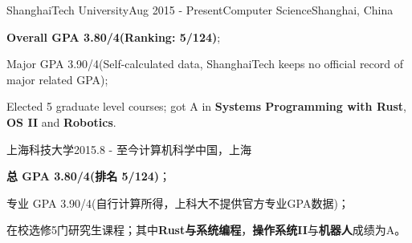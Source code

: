 \ifx\lang\eng
	\begin{rSubsection}{ShanghaiTech University}{Aug 2015 - Present}{Computer Science}{Shanghai, China}
		\item \textbf{Overall GPA 3.80/4(Ranking: 5/124)};
		\item Major GPA 3.90/4(Self-calculated data, ShanghaiTech keeps no official record of major related GPA);
		\item Elected 5 graduate level courses; got A in \textbf{Systems Programming with Rust}, \textbf{OS II} and \textbf{Robotics}.
	\end{rSubsection}
\else
	\begin{rSubsection}{上海科技大学}{2015.8 - 至今}{计算机科学}{中国，上海}
		\item \textbf{总 GPA 3.80/4(排名 5/124)}；
		\item 专业 GPA 3.90/4(自行计算所得，上科大不提供官方专业GPA数据)；
		\item 在校选修5门研究生课程；其中\textbf{Rust与系统编程}，\textbf{操作系统II}与\textbf{机器人}成绩为A。
	\end{rSubsection}
\fi
